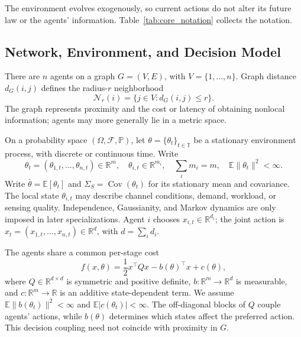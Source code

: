 \documentclass[11pt]{article}
\begin{document}
The environment evolves exogenously, so current actions do not alter its future
law or the agents' information. Table~\ref{tab:core_notation} collects the notation.

\subsection{Network, Environment, and Decision Model}
\label{subsec:decision_model}

There are $n$ agents on a graph $G=(V,E)$, with $V=\{1,\ldots,n\}$.
Graph distance $d_G(i,j)$ defines the radius-$r$ neighborhood
\begin{equation}
\mathcal N_r(i)=\{j\in V:d_G(i,j)\le r\}.
\label{eq:r_neighborhood}
\end{equation}
The graph represents proximity and the cost or latency of obtaining nonlocal
information; agents may more generally lie in a metric space.

On a probability space $(\Omega,\mathcal F,\mathbb P)$, let
$\theta=\{\theta_t\}_{t\in\mathbb T}$ be a stationary environment process,
with discrete or continuous time. Write
\begin{equation}
\theta_t=(\theta_{1,t},\ldots,\theta_{n,t})\in\mathbb R^m,
\quad \theta_{i,t}\in\mathbb R^{m_i},\quad \sum_i m_i=m,
\quad \mathbb E\|\theta_t\|^2<\infty.
\label{eq:state_partition}
\end{equation}
Write $\bar\theta=\mathbb E[\theta_t]$ and
$\Sigma_S=\operatorname{Cov}(\theta_t)$ for its stationary mean and covariance.
The local state $\theta_{i,t}$ may describe channel conditions, demand,
workload, or sensing quality. Independence, Gaussianity, and Markov dynamics
are only imposed in later specializations. Agent $i$ chooses
$x_{i,t}\in\mathbb R^{d_i}$; the joint action is
$x_t=(x_{1,t},\ldots,x_{n,t})\in\mathbb R^d$, with $d=\sum_i d_i$.

The agents share a common per-stage cost
\begin{equation}
    f(x,\theta)
    =
    \frac{1}{2}x^\top Qx
    -
    b(\theta)^\top x
    +
    c(\theta),
    \label{eq:quadratic_cost}
\end{equation}
where $Q\in\mathbb{R}^{d\times d}$ is symmetric and positive definite,
$b:\mathbb{R}^{m}\rightarrow\mathbb{R}^{d}$ is measurable, and
$c:\mathbb{R}^{m}\rightarrow\mathbb{R}$ is an additive state-dependent term.
We assume $\mathbb E\|b(\theta_t)\|^2<\infty$ and
$\mathbb E|c(\theta_t)|<\infty$. The off-diagonal blocks of $Q$ couple agents'
actions, while $b(\theta)$ determines which states affect the preferred action.
This decision coupling need not coincide with proximity in $G$.
\end{document}
